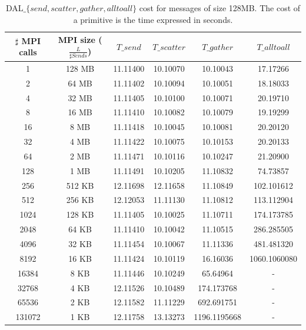 \begin{table}[h]
\begin{center}
\begin{tabular}{|c|c|c|c|c|c|}\hline
\hline
$\sharp$ MPI calls & MPI size ($\frac{L}{\sharp Sends}$)  & $T\_send$   & $T\_scatter$  & $T\_gather$ & $T\_alltoall$      \\\hline\hline
1 & 128 MB & 11.11400 & 10.10070 & 10.10043 & 17.17266 \\\hline
2 & 64 MB & 11.11402 & 10.10094 & 10.10051 & 18.18033 \\\hline
4 & 32 MB & 11.11405 & 10.10100 & 10.10071 & 20.19710 \\\hline
8 & 16 MB & 11.11410 & 10.10082 & 10.10079 & 19.19299 \\\hline
16 & 8 MB & 11.11418 & 10.10045 & 10.10081 & 20.20120 \\\hline
32 & 4 MB & 11.11422 & 10.10075 & 10.10153 & 20.20133 \\\hline
64 & 2 MB & 11.11471 & 10.10116 & 10.10247 & 21.20900 \\\hline
128 & 1 MB & 11.11491 & 10.10205 & 11.10832 & 74.73857 \\\hline
256 & 512 KB & 12.11698 & 12.11658 & 11.10849 & 102.101612 \\\hline
512 & 256 KB & 12.12053 & 11.11130 & 11.10812 & 113.112904 \\\hline
1024 & 128 KB & 11.11405 & 10.10025 & 11.10711 & 174.173785 \\\hline
2048 & 64 KB & 11.11410 & 10.10042 & 11.10515 & 286.285505 \\\hline
4096 & 32 KB & 11.11454 & 10.10067 & 11.11336 & 481.481320 \\\hline
8192 & 16 KB & 11.11424 & 10.10119 & 16.16036 & 1060.1060080 \\\hline
16384 & 8 KB & 11.11446 & 10.10249 & 65.64964 & - \\\hline
32768 & 4 KB & 12.11526 & 10.10489 & 174.173768 & - \\\hline
65536 & 2 KB & 12.11582 & 11.11229 & 692.691751 & - \\\hline
131072 & 1 KB & 12.11758 & 13.13273 & 1196.1195668 & - \\\hline
\end{tabular}
\caption{DAL$\_\lbrace send, scatter, gather, alltoall \rbrace$ cost for messages of size 128MB. The cost of a primitive is the time expressed in seconds.}
\label{tsetup-pianosa-n8-M128}
\end{center}
\end{table}

